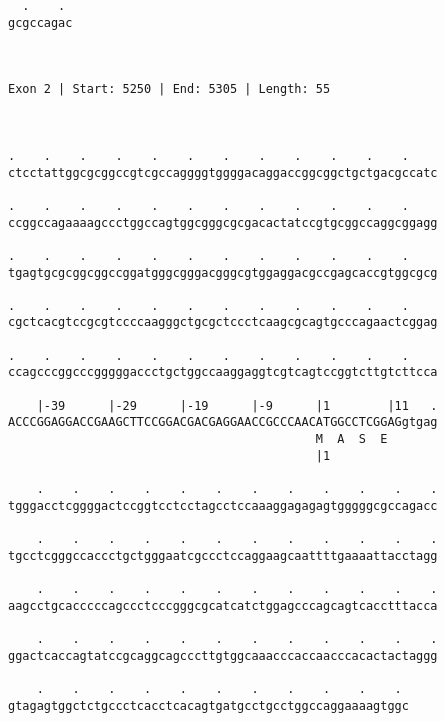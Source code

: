 \documentclass{article}
\begin{document}
\begin{Verbatim}
  .    . 
gcgccagac
         
         
 
Exon 2 | Start: 5250 | End: 5305 | Length: 55



.    .    .    .    .    .    .    .    .    .    .    .    
ctcctattggcgcggccgtcgccaggggtggggacaggaccggcggctgctgacgccatc
                                                            
.    .    .    .    .    .    .    .    .    .    .    .    
ccggccagaaaagccctggccagtggcgggcgcgacactatccgtgcggccaggcggagg
                                                            
.    .    .    .    .    .    .    .    .    .    .    .    
tgagtgcgcggcggccggatgggcgggacgggcgtggaggacgccgagcaccgtggcgcg
                                                            
.    .    .    .    .    .    .    .    .    .    .    .    
cgctcacgtccgcgtccccaagggctgcgctccctcaagcgcagtgcccagaactcggag
                                                            
.    .    .    .    .    .    .    .    .    .    .    .    
ccagcccggcccgggggaccctgctggccaaggaggtcgtcagtccggtcttgtcttcca
                                                            
    |-39      |-29      |-19      |-9      |1        |11   .
ACCCGGAGGACCGAAGCTTCCGGACGACGAGGAACCGCCCAACATGGCCTCGGAGgtgag
                                           M  A  S  E       
                                           |1               
  
    .    .    .    .    .    .    .    .    .    .    .    .
tgggacctcggggactccggtcctcctagcctccaaaggagagagtgggggcgccagacc
                                                            
    .    .    .    .    .    .    .    .    .    .    .    .
tgcctcgggccaccctgctgggaatcgccctccaggaagcaattttgaaaattacctagg
                                                            
    .    .    .    .    .    .    .    .    .    .    .    .
aagcctgcacccccagccctcccgggcgcatcatctggagcccagcagtcacctttacca
                                                            
    .    .    .    .    .    .    .    .    .    .    .    .
ggactcaccagtatccgcaggcagcccttgtggcaaacccaccaacccacactactaggg
                                                            
    .    .    .    .    .    .    .    .    .    .    . 
gtagagtggctctgccctcacctcacagtgatgcctgcctggccaggaaaagtggc
                                                        

\end{Verbatim}
\end{document}
